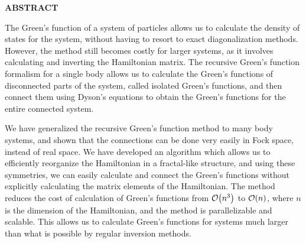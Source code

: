 \begin{center}
{\large {\bf  ABSTRACT }}
\end{center}  
The Green's function of a system of particles allows us to calculate the density of states for the system, without having to resort to exact diagonalization methods. However, the method still becomes costly for larger systems, as it involves calculating and inverting the Hamiltonian matrix. The recursive Green's function formalism for a single body allows us to calculate the Green's functions of disconnected parts of the system, called isolated Green's functions, and then connect them using Dyson's equations to obtain the Green's functions for the entire connected system.

We have generalized the recursive Green's function method to many body systems, and shown that the connections can be done very easily in Fock space, instead of real space. We have developed an algorithm which allows us to efficiently reorganize the Hamiltonian in a fractal-like structure, and using these symmetries, we can easily calculate and connect the Green's functions without explicitly calculating the matrix elements of the Hamiltonian. The method reduces the cost of calculation of Green's functions from $ \order{n^3} $ to $ \order{n} $, where $ n $ is the dimension of the Hamiltonian, and the method is parallelizable and scalable. This allows us to calculate Green's functions for systems much larger than what is possible by regular inversion methods.